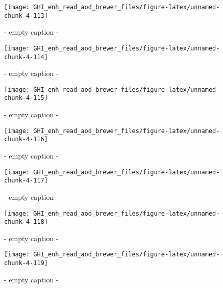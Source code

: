 \documentclass[
  10pt,
  a4paper,oneside]{article}
\begin{document}
\begin{figure}[H]

{\centering \texttt{[image: GHI\_enh\_read\_aod\_brewer\_files/figure-latex/unnamed-chunk-4-113]} 

}

\caption{ - empty caption - }\label{fig:unnamed-chunk-4-113}
\end{figure}
\begin{figure}[H]

{\centering \texttt{[image: GHI\_enh\_read\_aod\_brewer\_files/figure-latex/unnamed-chunk-4-114]} 

}

\caption{ - empty caption - }\label{fig:unnamed-chunk-4-114}
\end{figure}
\begin{figure}[H]

{\centering \texttt{[image: GHI\_enh\_read\_aod\_brewer\_files/figure-latex/unnamed-chunk-4-115]} 

}

\caption{ - empty caption - }\label{fig:unnamed-chunk-4-115}
\end{figure}
\begin{figure}[H]

{\centering \texttt{[image: GHI\_enh\_read\_aod\_brewer\_files/figure-latex/unnamed-chunk-4-116]} 

}

\caption{ - empty caption - }\label{fig:unnamed-chunk-4-116}
\end{figure}
\begin{figure}[H]

{\centering \texttt{[image: GHI\_enh\_read\_aod\_brewer\_files/figure-latex/unnamed-chunk-4-117]} 

}

\caption{ - empty caption - }\label{fig:unnamed-chunk-4-117}
\end{figure}
\begin{figure}[H]

{\centering \texttt{[image: GHI\_enh\_read\_aod\_brewer\_files/figure-latex/unnamed-chunk-4-118]} 

}

\caption{ - empty caption - }\label{fig:unnamed-chunk-4-118}
\end{figure}
\begin{figure}[H]

{\centering \texttt{[image: GHI\_enh\_read\_aod\_brewer\_files/figure-latex/unnamed-chunk-4-119]} 

}

\caption{ - empty caption - }\label{fig:unnamed-chunk-4-119}
\end{figure}
\end{document}
